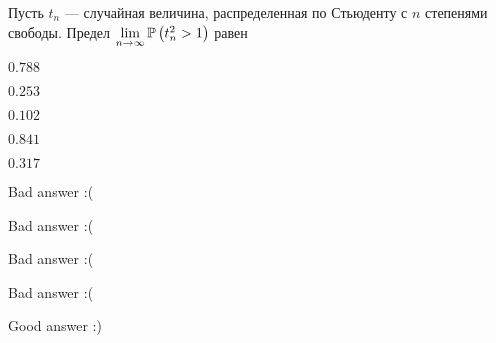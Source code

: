 
\begin{question}
Пусть \(t_n\) --- случайная величина, распределенная по Стьюденту с
\(n\) степенями свободы. Предел
\(\lim\limits_{n\to\infty}\P\left(t_{n}^2>1\right)\) равен
\begin{answerlist}
  \item \(0.788\)
  \item \(0.253\)
  \item \(0.102\)
  \item \(0.841\)
  \item \(0.317\)
\end{answerlist}
\end{question}

\begin{solution}
\begin{answerlist}
  \item Bad answer :(
  \item Bad answer :(
  \item Bad answer :(
  \item Bad answer :(
  \item Good answer :)
\end{answerlist}
\end{solution}

